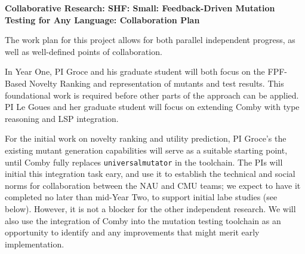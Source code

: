 \documentclass[11pt]{article}
\begin{document}
\begin{center}
{\Large\sf\textbf{Collaborative Research: SHF: Small: Feedback-Driven
    Mutation Testing for Any Language: Collaboration Plan }} 
\end{center}


%

The work plan for this project allows for both parallel independent progress, as
well as well-defined points of collaboration.

In Year One, PI Groce and his graduate student will both focus on the FPF-Based
Novelty Ranking and representation of mutants and test results.  This
foundational work is required before other parts of the approach can be applied.
PI Le Goues and her graduate student will focus on extending Comby with type
reasoning and LSP integration.   

For the initial work on novelty ranking and utility prediction, PI Groce's the
existing mutant generation capabilities will serve as a suitable starting
point, until Comby fully replaces {\tt universalmutator} in the toolchain.  The
PIs will initial this integration task eary, and use it to establish
the technical and social norms for collaboration between the NAU and CMU teams;
we expect to have it completed no later than mid-Year Two, to support initial
labe studies (see below).  
However, it is not a blocker for the other independent research.  
We will also use the integration of Comby into the mutation testing toolchain as
an opportunity to identify and any improvements that might merit early
implementation.
\end{document}
